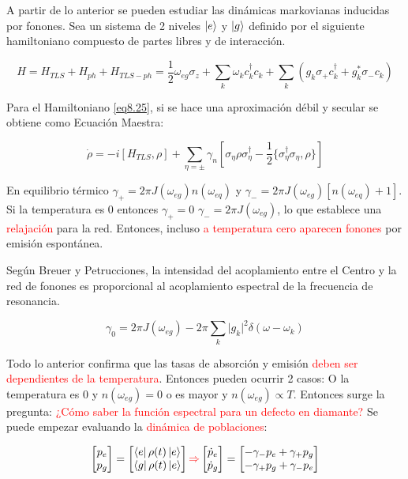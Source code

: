 \documentclass{book}
\begin{document}
A partir de lo anterior se pueden estudiar las dinámicas markovianas inducidas por fonones. Sea un sistema de 2 niveles $\ket{e}$ y $\ket{g}$ definido por el siguiente hamiltoniano compuesto de partes libres y de interacción.

\begin{equation}\label{eq8.25}H=H_{TLS}+H_{ph}+H_{TLS-ph}=\frac{1}{2}\omega_{eg}\sigma_z+\sum_k\omega_kc_k^\dag c_k+\sum_k (g_k \sigma_+ c_k^\dag+g_k^* \sigma_-c_k)\end{equation}

Para el Hamiltoniano \ref{eq8.25}, si se hace una aproximación débil y secular se obtiene como Ecuación Maestra:

\begin{equation}\label{eq8.26}\dot{\rho}=-i[H_{TLS},\rho]+\sum_{\eta=\pm}\gamma_n[\sigma_\eta\rho\sigma_\eta^\dag-\frac{1}{2}\{\sigma^\dag_\eta\sigma_\eta,\rho\}]\end{equation}

En equilibrio térmico $\gamma_+=2\pi J(\omega_{eg})n(\omega_{eq})$ y $\gamma_-=2\pi J(\omega_{eg})[n(\omega_{eq})+1]$. Si la temperatura es 0 entonces $\gamma_+=0$ $\gamma_-=2\pi J(\omega_{eg})$, lo que establece una \textcolor{red}{relajación} para la red. Entonces, incluso \textcolor{red}{a temperatura cero aparecen fonones} por emisión espontánea. 

Según Breuer y Petrucciones, la intensidad del acoplamiento entre el Centro y la red de fonones es proporcional al acoplamiento espectral de la frecuencia de resonancia.

\begin{equation}\label{eq8.27}\gamma_0=2\pi J(\omega_{eg})-2\pi\sum_k \lvert g_k\rvert^2 \delta(\omega-\omega_k)\end{equation}

Todo lo anterior confirma que las tasas de absorción y emisión \textcolor{red}{deben ser dependientes de la temperatura}. Entonces pueden ocurrir 2 casos: O la temperatura es 0 y $n(\omega_{eg})=0$ o es mayor y $n(\omega_{eg})\propto T$. Entonces surge la pregunta: \textcolor{red}{¿Cómo saber la función espectral para un defecto en diamante?} Se puede empezar evaluando la \textcolor{red}{dinámica de poblaciones}:

\begin{equation}\label{eq8.28}\begin{bmatrix} p_e\\p_g \end{bmatrix}=\begin{bmatrix} \bra{e}\rho(t)\ket{e}\\ \bra{g}\rho(t)\ket{e}\end{bmatrix}\textcolor{red}{\Rightarrow} \begin{bmatrix} \dot{p}_e\\\dot{p}_g \end{bmatrix}=\begin{bmatrix}-\gamma_-p_e+\gamma_+ p_g\\-\gamma_+p_g+\gamma_-p_e\end{bmatrix}\end{equation}
\end{document}
